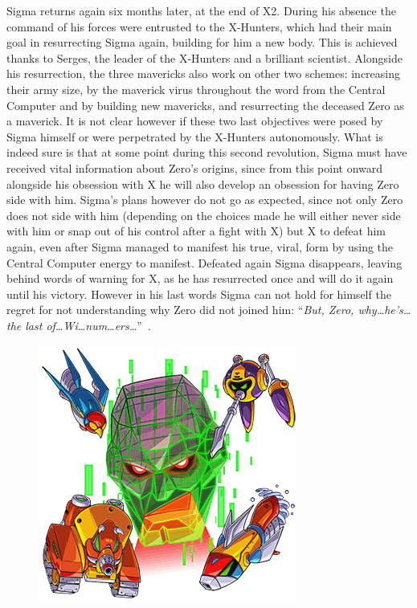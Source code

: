 Sigma returns again six months later, at the end of X2. During his absence the command of his forces were entrusted to the X-Hunters, which had their main goal in resurrecting Sigma again, building for him a new body. This is achieved thanks to Serges, the leader of the X-Hunters and a brilliant scientist. Alongside his resurrection, the three mavericks also work on other two schemes: increasing their army size, by the maverick virus throughout the word from the Central Computer and by building new mavericks, and resurrecting the deceased Zero as a maverick. It is not clear however if these two last objectives were posed by Sigma himself or were perpetrated by the X-Hunters autonomously. What is indeed sure is that at some point during this second revolution, Sigma must have received vital information about Zero's origins, since from this point onward alongside his obsession with X he will also develop an obsession for having Zero side with him. Sigma's plans however do not go as expected, since not only Zero does not side with him (depending on the choices made he will either never side with him or snap out of his control after a fight with X) but X  to defeat him again, even after Sigma managed to manifest his true, viral, form by using the Central Computer energy to manifest. Defeated again Sigma disappears, leaving behind words of warning for X, as he has resurrected once and will do it again until his victory. However in his last words Sigma can not hold for himself the regret for not understanding why Zero did not joined him: ``\textit{But, Zero, why…he’s…the last of…Wi…num…ers…}''~\cite{wordpress:X2_japanese_script}.
\begin{figure}[h]
	\centering
	\includegraphics[width=0.4\linewidth]{figures/X2/Hunter_stages/Sigma_Virus.png}
\end{figure}



